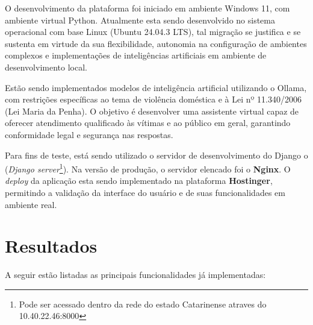 \par O desenvolvimento da plataforma foi iniciado em ambiente Windows 11, com ambiente virtual Python. Atualmente esta sendo desenvolvido no sistema operacional com base Linux (Ubuntu 24.04.3 LTS), tal migração se justifica e se sustenta em virtude da sua flexibilidade, autonomia na configuração de ambientes complexos e implementações de inteligências artificiais em ambiente de desenvolvimento local.

\par Estão sendo implementados modelos de inteligência artificial utilizando o Ollama, com restrições específicas ao tema de violência doméstica e à Lei nº 11.340/2006 (Lei Maria da Penha). O objetivo é desenvolver uma assistente virtual capaz de oferecer atendimento qualificado às vítimas e ao público em geral, garantindo conformidade legal e segurança nas respostas.

\par Para fins de teste, está sendo utilizado o servidor de desenvolvimento do Django o (\textit{Django server}\footnote{Pode ser acessado dentro da rede do estado Catarinense atraves do 10.40.22.46:8000}). Na versão de produção, o servidor elencado foi o \textbf{Nginx}. O \textit{deploy} da aplicação esta sendo implementado na plataforma \textbf{Hostinger}, permitindo a validação da interface do usuário e de suas funcionalidades em ambiente real.


\section{Resultados}

A seguir estão listadas as principais funcionalidades já implementadas:

